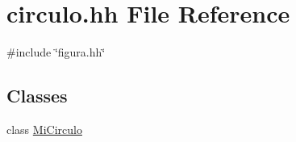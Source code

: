 \hypertarget{circulo_8hh}{\section{circulo.\-hh \-File \-Reference}
\label{circulo_8hh}
}
{\ttfamily \#include \char`\"{}figura.\-hh\char`\"{}}\*
\subsection*{\-Classes}
\begin{DoxyCompactItemize}
\item 
class \hyperlink{class_mi_circulo}{\-Mi\-Circulo}
\end{DoxyCompactItemize}
